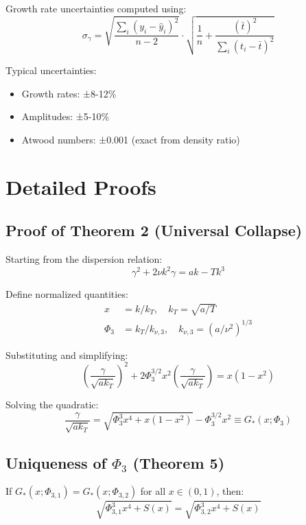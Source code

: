 \documentclass[aps,pre,twocolumn,superscriptaddress]{revtex4-2}
\begin{document}
Growth rate uncertainties computed using:
\begin{equation}
\sigma_\gamma = \sqrt{\frac{\sum_i (y_i - \hat{y}_i)^2}{n-2}} \cdot \sqrt{\frac{1}{n} + \frac{(\bar{t})^2}{\sum_i(t_i-\bar{t})^2}}
\end{equation}

Typical uncertainties:
\begin{itemize}
\item Growth rates: ±8-12\%
\item Amplitudes: ±5-10\%
\item Atwood numbers: ±0.001 (exact from density ratio)
\end{itemize}

\section{Detailed Proofs}

\subsection{Proof of Theorem 2 (Universal Collapse)}

Starting from the dispersion relation:
\begin{equation}
\gamma^2 + 2\nu k^2 \gamma = ak - Tk^3
\end{equation}

Define normalized quantities:
\begin{align}
x &= k/k_T, \quad k_T = \sqrt{a/T} \\
\Phi_3 &= k_T/k_{\nu,3}, \quad k_{\nu,3} = (a/\nu^2)^{1/3}
\end{align}

Substituting and simplifying:
\begin{equation}
\left(\frac{\gamma}{\sqrt{ak_T}}\right)^2 + 2\Phi_3^{3/2} x^2 \left(\frac{\gamma}{\sqrt{ak_T}}\right) = x(1-x^2)
\end{equation}

Solving the quadratic:
\begin{equation}
\frac{\gamma}{\sqrt{ak_T}} = \sqrt{\Phi_3^3 x^4 + x(1-x^2)} - \Phi_3^{3/2} x^2 \equiv G_*(x;\Phi_3)
\end{equation}

\subsection{Uniqueness of $\Phi_3$ (Theorem 5)}

If $G_*(x;\Phi_{3,1}) = G_*(x;\Phi_{3,2})$ for all $x \in (0,1)$, then:
\begin{equation}
\sqrt{\Phi_{3,1}^3 x^4 + S(x)} = \sqrt{\Phi_{3,2}^3 x^4 + S(x)}
\end{equation}
\end{document}

